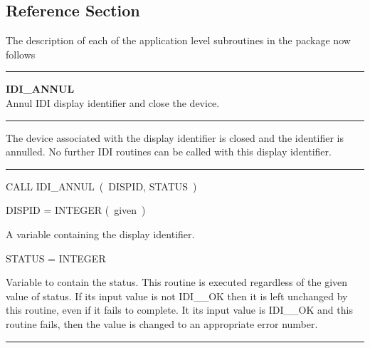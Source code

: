 \subsection{Reference Section}

The description of each of the application level subroutines in the package
now follows

\vspace{10mm}
\parbox{160mm}{

\rule{160mm}{0.5mm}

\hspace*{10mm}\parbox{140mm}{
{\bf IDI\_ANNUL} \\
Annul IDI display identifier and close the device.}

\rule{160mm}{0.1mm}

\hspace*{10mm}\parbox{140mm}{
The device associated with the display identifier is closed and the
identifier is annulled. No further IDI routines can be called with this
display identifier.}

\rule{160mm}{0.1mm}

\hspace*{10mm}\parbox{140mm}{
CALL IDI\_ANNUL~(~DISPID, STATUS~)}

\hspace*{10mm}\parbox{140mm}{
DISPID = INTEGER \hspace{10mm} (~given~)}

\hspace*{30mm}\parbox{120mm}{
A variable containing the display identifier.}

\hspace*{10mm}\parbox{140mm}{
STATUS = INTEGER}

\hspace*{30mm}\parbox{120mm}{
Variable to contain the status. This routine is executed regardless of the
given value of status. If its input value is not IDI\_\_OK then it is left
unchanged by this routine, even if it fails to complete. It its input value
is IDI\_\_OK and this routine fails, then the value is changed to an
appropriate error number.}

\rule{160mm}{0.5mm}
}

